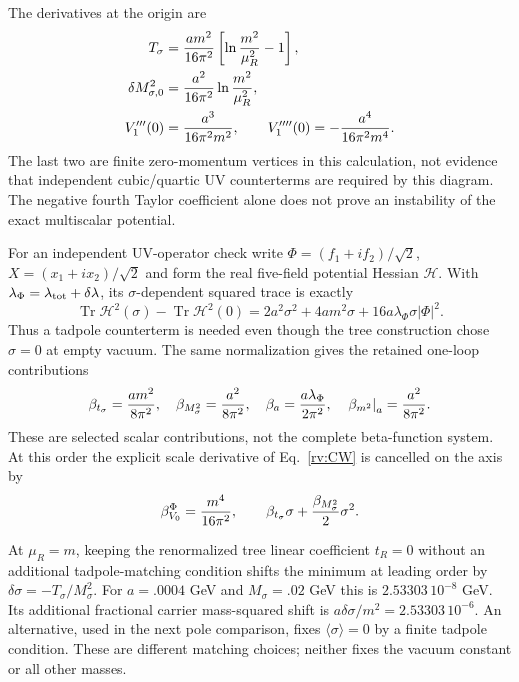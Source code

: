 \documentclass[11pt]{article}
\begin{document}
The derivatives at the origin are
\begin{align}
 T_\sigma&={a m^2\over16\pi^2}
                         \left[\ln{m^2\over\mu_R^2}-1\right],\\
 \delta M_{\sigma,0}^2&={a^2\over16\pi^2}\ln{m^2\over\mu_R^2},\\
 V_1'''(0)&={a^3\over16\pi^2m^2},\qquad
 V_1''''(0)=-{a^4\over16\pi^2m^4}.
\end{align}
The last two are finite zero-momentum vertices in this calculation, not
evidence that independent cubic/quartic UV counterterms are required by
this diagram. The negative fourth Taylor coefficient alone does not prove
an instability of the exact multiscalar potential.

For an independent UV-operator check write
$\Phi=(f_1+if_2)/\sqrt2$, $X=(x_1+ix_2)/\sqrt2$ and form the real
five-field potential Hessian $\mathcal H$. With
$\lambda_\Phi=\lambda_{\rm tot}+\delta\lambda$, its
$\sigma$-dependent squared trace is exactly
\begin{equation}
 \operatorname{Tr}\mathcal H^2(\sigma)
 -\operatorname{Tr}\mathcal H^2(0)
 =2a^2\sigma^2+4am^2\sigma+16a\lambda_\Phi\sigma|\Phi|^2.
\end{equation}
Thus a tadpole counterterm is needed even though the tree construction
chose $\sigma=0$ at empty vacuum. The same normalization gives the retained
one-loop contributions
\begin{equation}
 \beta_{t_\sigma}={am^2\over8\pi^2},\quad
 \beta_{M_\sigma^2}={a^2\over8\pi^2},\quad
 \beta_a={a\lambda_\Phi\over2\pi^2},\quad
 \left.\beta_{m^2}\right|_a={a^2\over8\pi^2}.
 \label{rv:betas}
\end{equation}
These are selected scalar contributions, not the complete beta-function
system. At this order the explicit scale derivative of
Eq.~\eqref{rv:CW} is cancelled on the axis by
\begin{equation}
 \beta_{V_0}^\Phi={m^4\over16\pi^2},\qquad
 \beta_{t_\sigma}\sigma+{\beta_{M_\sigma^2}\over2}\sigma^2.
\end{equation}

At $\mu_R=m$, keeping the renormalized tree linear coefficient $t_R=0$
without an additional tadpole-matching condition shifts the minimum at leading order by
$\delta\sigma=-T_\sigma/M_\sigma^2$.
For $a=.0004$ GeV and $M_\sigma=.02$ GeV this is
$2.53303\,10^{-8}$ GeV. Its additional fractional carrier mass-squared
shift is $a\delta\sigma/m^2=2.53303\,10^{-6}$. An alternative, used in
the next pole comparison, fixes $\langle\sigma\rangle=0$ by a finite
tadpole condition. These are different matching choices; neither fixes
the vacuum constant or all other masses.
\end{document}
